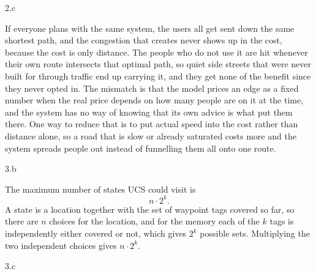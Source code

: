 \LARGE
2.c
\normalsize

\begin{answer}
  If everyone plans with the same system, the users all get sent down the same shortest path, and
  the congestion that creates never shows up in the cost, because the cost is only distance. The
  people who do not use it are hit whenever their own route intersects that optimal path, so quiet
  side streets that were never built for through traffic end up carrying it, and they get none of
  the benefit since they never opted in. The mismatch is that the model prices an edge as a fixed
  number when the real price depends on how many people are on it at the time, and the system has no
  way of knowing that its own advice is what put them there. One way to reduce that is to put actual
  speed into the cost rather than distance alone, so a road that is slow or already saturated costs
  more and the system spreads people out instead of funnelling them all onto one route.
\end{answer}

\clearpage

\LARGE
3.b
\normalsize

\begin{answer}
  The maximum number of states UCS could visit is
  \[
    n \cdot 2^{k} .
  \]
  A state is a location together with the set of waypoint tags covered so far, so there are $n$
  choices for the location, and for the memory each of the $k$ tags is independently either covered
  or not, which gives $2^{k}$ possible sets. Multiplying the two independent choices gives
  $n \cdot 2^{k}$.
\end{answer}
\clearpage

\LARGE
3.c
\normalsize

